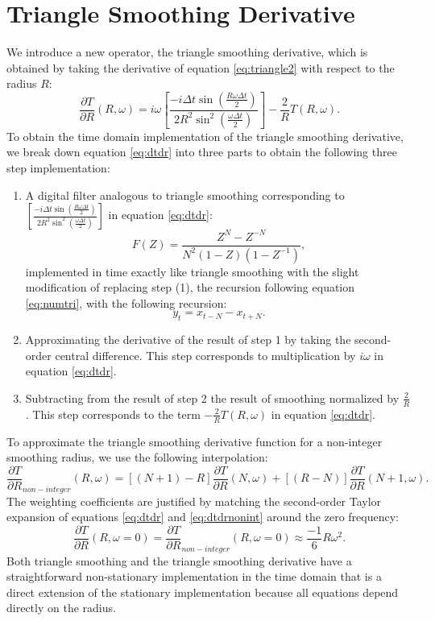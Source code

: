 \section{Triangle Smoothing Derivative}
We introduce a new operator, the triangle smoothing derivative, which is obtained by taking the derivative of equation \ref{eq:triangle2} with respect to the radius $R$:
\begin{equation}
\frac{\partial T}{\partial R}(R,\omega) = i\omega \left[\frac{-i \Delta t \sin(\frac{R\omega \Delta t}{2})}{2R^2\sin^2(\frac{\omega \Delta t}{2})}\right] - \frac{2}{R}T(R,\omega).
\label{eq:dtdr}
\end{equation}
To obtain the time domain implementation of the triangle smoothing derivative, we break down equation \ref{eq:dtdr} into three parts to obtain the following three step implementation:
\begin{enumerate}
    \item A digital filter analogous to triangle smoothing corresponding to $\left[\frac{-i \Delta t \sin(\frac{R\omega \Delta t}{2})}{2R^2\sin^2(\frac{\omega \Delta t}{2})}\right]$ in equation \ref{eq:dtdr}:
    \begin{equation}
    F(Z)=\frac{Z^N-Z^{-N}}{N^2(1-Z)(1-Z^{-1})},
    \end{equation}
    implemented in time exactly like triangle smoothing with the slight modification of replacing step (1), the recursion following equation \ref{eq:numtri}, with the following recursion: 
    \begin{equation}
        y_{t} = x_{t-N}-x_{t+N}.
    \end{equation}
    \item Approximating the derivative of the result of step 1 by taking the second-order central difference. This step corresponds to multiplication by $i\omega$ in equation \ref{eq:dtdr}.
    \item Subtracting from the result of step 2 the result of smoothing normalized by $\frac{2}{R}$. This step corresponds to the term $-\frac{2}{R}T(R,\omega)$ in equation \ref{eq:dtdr}.
\end{enumerate}
To approximate the triangle smoothing derivative function for a non-integer smoothing radius, we use the following interpolation:
\begin{equation}
\frac{\partial T}{\partial R}_{non-integer}(R,\omega) = [(N+1)-R]\frac{\partial T}{\partial R}(N,\omega) + [(R-N)]\frac{\partial T}{\partial R}(N+1,\omega).
\label{eq:dtdrnonint}
\end{equation}
The weighting coefficients are justified by matching the second-order Taylor expansion of equations \ref{eq:dtdr} and \ref{eq:dtdrnonint} around the zero frequency:
\begin{equation}
\frac{\partial T}{\partial R}(R,\omega=0)=\frac{\partial T}{\partial R}_{non-integer}(R,\omega=0) \approx \frac{-1}{6}R\omega^2.
\end{equation}
Both triangle smoothing and the triangle smoothing derivative have a straightforward non-stationary implementation in the time domain that is a direct extension of the stationary implementation because all equations depend directly on the radius.


